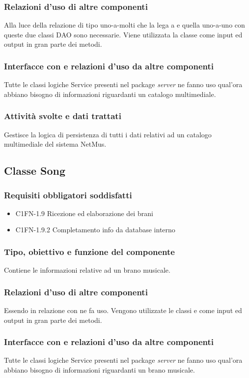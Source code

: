 \subsubsection*{Relazioni d'uso di altre componenti} Alla luce della relazione
di tipo uno-a-molti che la lega a  e quella uno-a-uno con
 queste due classi DAO sono necessarie. Viene utilizzata la
classe  come input ed output in gran parte dei metodi.
\subsubsection*{Interfacce con e relazioni d'uso da altre componenti} Tutte le
classi logiche Service presenti nel package \emph{server} ne fanno uso qual'ora
abbiano bisogno di informazioni riguardanti un catalogo multimediale.
\subsubsection*{Attivit\`a svolte e dati trattati} Gestisce la logica di
persistenza di tutti i dati relativi ad un catalogo multimediale del sistema
NetMus.

\subsection{Classe Song}
\subsubsection*{Requisiti obbligatori soddisfatti}
\begin{itemize}
	\item C1FN-1.9 Ricezione ed elaborazione dei brani
	\item C1FN-1.9.2 Completamento info da database interno
\end{itemize}
\subsubsection*{Tipo, obiettivo e funzione del componente} Contiene le
informazioni relative ad un brano musicale. 
\subsubsection*{Relazioni d'uso di
altre componenti} Essendo in relazione con  ne fa uso. Vengono
utilizzate le classi  e  come input ed output
in gran parte dei metodi. 
\subsubsection*{Interfacce con e relazioni d'uso da
altre componenti} Tutte le classi logiche Service presenti nel package
\emph{server} ne fanno uso qual'ora abbiano bisogno di informazioni riguardanti
un brano musicale. 

